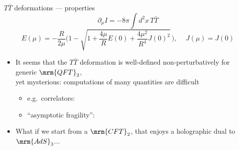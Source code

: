 \documentclass[aspectratio=169,10pt
	,noamsthm
]{beamer}
\newcommand{\TTbar}{\texorpdfstring{\ensuremath{T\bar{T}}}{TTbar}\xspace}
\begin{document}
\begin{frame}{\TTbar deformations --- properties}{%
	\textcite{Zamolodchikov:2004ce}\\
}
\vspace{-1.\baselineskip}
\begin{equation}
	\partial_\mu I = -{8 \pi} \int d^2x\,T\bar T
	\label{TTbardef}
\end{equation}
\begin{equation}
	E(\mu) = - \frac{R }{ 2\mu } \bigg(1-\sqrt{1 + \frac{4\mu}{R} E(0) + \frac{4\mu^2}{R^4} J(0)^2 }
	\,\bigg), \ \quad J(\mu)=J(0)  \label{ttbarspectrum}
\end{equation}
\vspace{-\baselineskip}
\begin{itemize}
\item It seems that the \TTbar deformation is well-defined non-perturbatively for generic $\mrm{QFT}_2$,\\
yet mysterious: computations of many quantities are difficult\\
\begin{itemize}
\item e.g.~correlators: \textcite{Kraus:2018xrn,Cardy:2019qao,Cui:2023jrb}
\item ``asymptotic fragility'': \textcite{Dubovsky:2017cnj}
\end{itemize}

\pause
\item What if we start from a $\mrm{CFT}_2$, that enjoys a holographic dual to $\mrm{AdS}_3$...

\end{itemize}
\end{frame}
\end{document}
